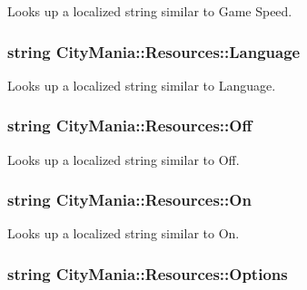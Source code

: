 Looks up a localized string similar to Game Speed. \hypertarget{classCityMania_1_1Resources_ab02fb301243f7303a0ff3453e4a39260}{
\subsubsection[{Language}]{\setlength{\rightskip}{0pt plus 5cm}string CityMania::Resources::Language}}
\label{classCityMania_1_1Resources_ab02fb301243f7303a0ff3453e4a39260}


Looks up a localized string similar to Language. \hypertarget{classCityMania_1_1Resources_a8e9eac5a0223fd7aeac5a56c11e52f46}{
\subsubsection[{Off}]{\setlength{\rightskip}{0pt plus 5cm}string CityMania::Resources::Off}}
\label{classCityMania_1_1Resources_a8e9eac5a0223fd7aeac5a56c11e52f46}


Looks up a localized string similar to Off. \hypertarget{classCityMania_1_1Resources_aa1871c95d9c56646b4ac945356bc04d0}{
\subsubsection[{On}]{\setlength{\rightskip}{0pt plus 5cm}string CityMania::Resources::On}}
\label{classCityMania_1_1Resources_aa1871c95d9c56646b4ac945356bc04d0}


Looks up a localized string similar to On. \hypertarget{classCityMania_1_1Resources_af64db8863ac6a534dab4955d41174608}{
\subsubsection[{Options}]{\setlength{\rightskip}{0pt plus 5cm}string CityMania::Resources::Options}}
\label{classCityMania_1_1Resources_af64db8863ac6a534dab4955d41174608}


